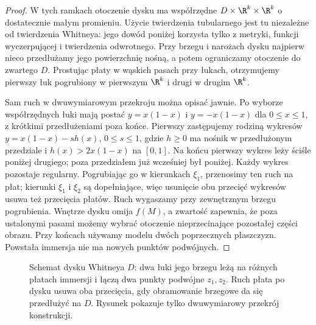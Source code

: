 \begin{proof}
W tych ramkach otoczenie dysku ma współrzędne
$D\times\R^k\times\R^k$ o dostatecznie małym promieniu.
Użycie twierdzenia tubularnego jest tu niezależne
od twierdzenia Whitneya: jego dowód poniżej korzysta
tylko z metryki, funkcji wyczerpującej i twierdzenia
odwrotnego. Przy brzegu i narożach dysku najpierw
nieco przedłużamy jego powierzchnię nośną, a potem
ograniczamy otoczenie do zwartego $D$.
Prostując płaty w wąskich pasach przy łukach,
otrzymujemy pierwszy łuk pogrubiony w pierwszym
$\R^k$ i drugi w drugim $\R^k$.

Sam ruch w dwuwymiarowym przekroju można opisać
jawnie. Po wyborze współrzędnych łuki mają postać
$y=x(1-x)$ i $y=-x(1-x)$ dla $0\leq x\leq1$,
z krótkimi przedłużeniami poza końce. Pierwszy
zastępujemy rodziną wykresów
$y=x(1-x)-s h(x)$, $0\leq s\leq1$, gdzie $h\geq0$
ma nośnik w przedłużonym przedziale i
$h(x)>2x(1-x)$ na $[0,1]$.
Na końcu pierwszy wykres leży ściśle poniżej
drugiego; poza przedziałem już wcześniej był poniżej.
Każdy wykres pozostaje regularny. Pogrubiając go
w kierunkach $\xi_1$, przenosimy ten ruch na płat;
kierunki $\xi_1$ i $\xi_2$ są dopełniające, więc
usunięcie obu przecięć wykresów usuwa też przecięcia
płatów. Ruch wygaszamy przy zewnętrznym brzegu
pogrubienia. Wnętrze dysku omija $f(M)$, a zwartość
zapewnia, że poza ustalonymi pasami możemy wybrać
otoczenie nieprzecinające pozostałej części obrazu.
Przy końcach używamy modelu dwóch poprzecznych
płaszczyzn. Powstała immersja nie ma nowych
punktów podwójnych.
\end{proof}

\begin{figure}[htbp]
\centering
{}
\caption{Schemat dysku Whitneya $D$: dwa łuki jego brzegu
leżą na różnych płatach immersji i łączą dwa punkty
podwójne $z_1,z_2$. Ruch płata po dysku usuwa oba
przecięcia, gdy obramowanie brzegowe da się
przedłużyć na $D$. Rysunek pokazuje tylko
dwuwymiarowy przekrój konstrukcji.}
\label{fig:dysk-whitneya-15}
\end{figure}

